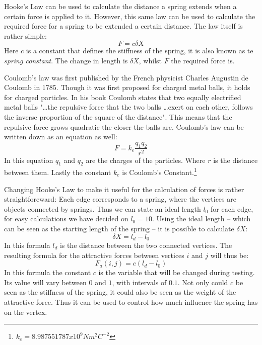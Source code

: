 \documentclass[a4paper,12pt]{article}
\begin{document}
    Hooke's Law can be used to calculate the distance a spring extends when a certain force is applied to it.
    However, this same law can be used to calculate the required force for a spring to be extended a certain distance.
    The law itself is rather simple:
    \begin{equation}
      F = c \delta X
    \end{equation}
    Here $c$ is a constant that defines the stiffness of the spring, it is also known as te \emph{spring constant}.
    The change in length is $\delta X$, whilst $F$ the required force is.

    Coulomb's law was first published by the French physicist Charles Augustin de Coulomb in 1785.\cite{coulomb1785premier}
    Though it was first proposed for charged metal balls, it holds for charged particles.
    In his book Coulomb states that two equally electrified metal balls "\ldots the repulsive force that the two balls \ldots exert on each other, follows the inverse proportion of the square of the distance".
    This means that the repulsive force grows quadratic the closer the balls are.
    Coulomb's law can be written down as an equation as well:
    \begin{equation}
      F = k_e \frac{q_1 q_2}{r^2}
    \end{equation}
     In this equation $q_1$ and $q_2$ are the charges of the particles.
    Where $r$ is the distance between them. Lastly the constant $k_e$ is Coulomb's Constant.\footnote{$k_e = 8.987551787 x 10^9 N m^2 C^{-2}$}

    Changing Hooke's Law to make it useful for the calculation of forces is rather straightforeward:
    Each edge corresponds to a spring, where the vertices are objects connected by springs.
    Thus we can state an ideal length $l_0$ for each edge, for easy calculations we have decided on $l_0 = 10$.
    Using the ideal length -- which can be seen as the starting length of the spring -- it is possible to calculate $\delta X$:
    \begin{equation}
      \delta X =  l_d - l_0
    \end{equation}
    In this formula $l_d$ is the distance between the two connected vertices.
    The resulting formula for the attractive forces between vertices $i$ and $j$ will thus be:
    \begin{equation}
      F_a (i,j) = c (l_d - l_0)
    \end{equation}
    In this formula the constant $c$ is the variable that will be changed during testing.
    Its value will vary between $ 0 $ and $1$, with intervals of $0.1$.
    Not only could $c$ be seen as the stiffness of the spring, it could also be seen as the weight of the attractive force.
    Thus it can be used to control how much influence the spring has on the vertex.
\end{document}
